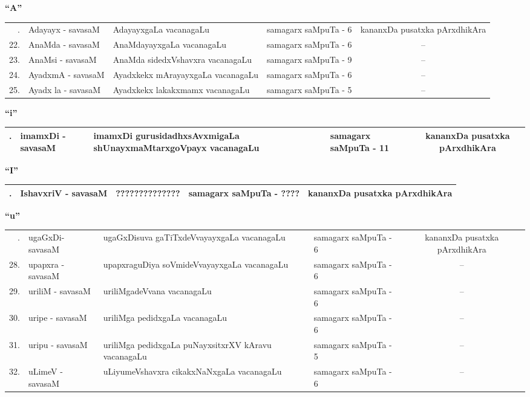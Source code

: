 \centerline{\bf ``A''}

{\renewcommand{\arraystretch}{1.3}
\begin{longtable}{rl>{\raggedright}p{5.5cm}lc}
\hline
\endfirsthead
\hline
\endhead
\hline
\endfoot
\endlastfoot
21. & Adayayx - savasaM & AdayayxgaLa vacanagaLu & samagarx saMpuTa - 6 & kananxDa pusatxka pArxdhikAra\\
22. & AnaMda - savasaM & AnaMdayayxgaLa vacanagaLu & samagarx saMpuTa - 6 & --\\
23. & AnaMsi - savasaM & AnaMda sidedxVshavxra vacanagaLu & samagarx saMpuTa - 9 & --\\
24. & AyadxmA - savasaM & Ayadxkekx mArayayxgaLa vacanagaLu & samagarx saMpuTa - 6 & --\\
25. & Ayadx la - savasaM & Ayadxkekx lakakxmamx vacanagaLu & samagarx saMpuTa - 5 & --\\
\hline
\end{longtable}}

\centerline{\bf ``i''}

{\renewcommand{\arraystretch}{1.3}
\begin{longtable}{rl>{\raggedright}p{5.5cm}lc}
\hline
\endfirsthead
\hline
\endhead
\hline
\endfoot
\endlastfoot
26. & imamxDi - savasaM & imamxDi gurusidadhxsAvxmigaLa shUnayxmaMtarxgoVpayx vacanagaLu & samagarx saMpuTa - 11 & kananxDa pusatxka pArxdhikAra\\
\hline
\end{longtable}}

\centerline{\bf ``I''}

{\renewcommand{\arraystretch}{1.3}
\begin{longtable}{rl>{\raggedright}p{5.5cm}lc}
\hline
\endfirsthead
\hline
\endhead
\hline
\endfoot
\endlastfoot
27. & IshavxriV - savasaM & ?????????????? & samagarx saMpuTa - ???? & kananxDa pusatxka pArxdhikAra\\
\hline
\end{longtable}}

\centerline{\bf ``u''}

{\renewcommand{\arraystretch}{1.3}
\begin{longtable}{rl>{\raggedright}p{5.5cm}lc}
\hline
\endfirsthead
\hline
\endhead
\hline
\endfoot
\endlastfoot
27. &  ugaGxDi- savasaM & ugaGxDisuva gaTiTxdeVvayayxgaLa vacanagaLu & samagarx saMpuTa - 6  & kananxDa pusatxka pArxdhikAra\\
28. &  upapxra - savasaM & upapxraguDiya soVmideVvayayxgaLa vacanagaLu & samagarx saMpuTa - 6 & --\\
29. &  uriliM - savasaM & uriliMgadeVvana vacanagaLu & samagarx saMpuTa - 6 & --\\
30. &  uripe - savasaM & uriliMga pedidxgaLa vacanagaLu & samagarx saMpuTa - 6 & --\\
31. &  uripu - savasaM & uriliMga pedidxgaLa puNayxsitxrXV kAravu vacanagaLu & samagarx saMpuTa - 5 & --\\
32. &  uLimeV - savasaM & uLiyumeVshavxra cikakxNaNxgaLa vacanagaLu & samagarx saMpuTa - 6  & --\\
\hline
\end{longtable}}

